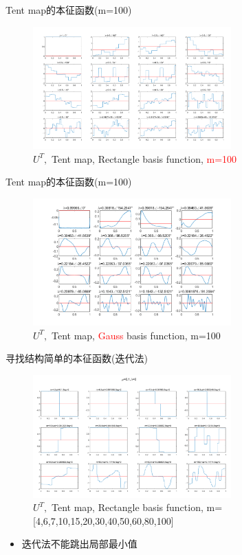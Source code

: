 \documentclass{beamer}
\begin{document}
\begin{frame}{Tent map的本征函数(m=100)}
\begin{figure}
	\centering
	\includegraphics[width=3in]{figure/tent_eigen_m100}
	\caption{$U^T,$ Tent map, Rectangle basis function, \textcolor{red}{m=100}}
\end{figure}
\end{frame}

\begin{frame}{Tent map的本征函数(m=100)}
\begin{figure}
	\centering
	\includegraphics[width=3in]{figure/tent_eigen_gauss}
	\caption{$U^T,$ Tent map, \textcolor{red}{Gauss} basis function, m=100}
\end{figure}
\end{frame}

\begin{frame}{寻找结构简单的本征函数(迭代法)}
\begin{figure}
	\centering
	\includegraphics[width=3in]{figure/tent_iter_minimun}
	\caption{$U^T,$ Tent map, Rectangle basis function, m=[4,6,7,10,15,20,30,40,50,60,80,100]}
\end{figure}
\begin{itemize}
	\item 迭代法不能跳出局部最小值
\end{itemize}
\end{frame}
\end{document}
